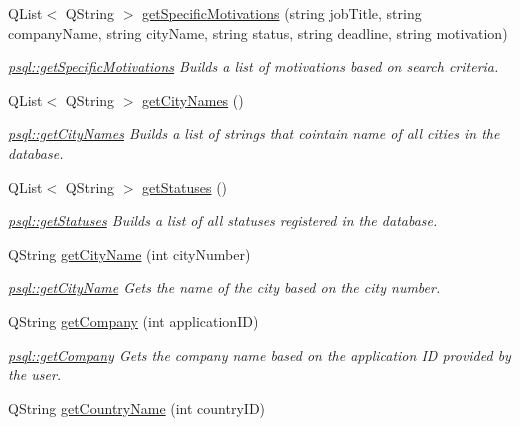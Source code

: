 \begin{DoxyCompactItemize}
Q\+List$<$ Q\+String $>$ \mbox{\hyperlink{classpsql_a7c86e4ba33784dece1bf897537087a68}{get\+Specific\+Motivations}} (string job\+Title, string company\+Name, string city\+Name, string status, string deadline, string motivation)
\begin{DoxyCompactList}\small\item\em \mbox{\hyperlink{classpsql_a7c86e4ba33784dece1bf897537087a68}{psql\+::get\+Specific\+Motivations}} Builds a list of motivations based on search criteria. \end{DoxyCompactList}\item 
Q\+List$<$ Q\+String $>$ \mbox{\hyperlink{classpsql_a42ee0cf90055ba6a7a6f564cf04d8bb8}{get\+City\+Names}} ()
\begin{DoxyCompactList}\small\item\em \mbox{\hyperlink{classpsql_a42ee0cf90055ba6a7a6f564cf04d8bb8}{psql\+::get\+City\+Names}} Builds a list of strings that cointain name of all cities in the database. \end{DoxyCompactList}\item 
Q\+List$<$ Q\+String $>$ \mbox{\hyperlink{classpsql_a14854d28aabc7e658aea87a7b8b52e5c}{get\+Statuses}} ()
\begin{DoxyCompactList}\small\item\em \mbox{\hyperlink{classpsql_a14854d28aabc7e658aea87a7b8b52e5c}{psql\+::get\+Statuses}} Builds a list of all statuses registered in the database. \end{DoxyCompactList}\item 
Q\+String \mbox{\hyperlink{classpsql_a7acc18034ef60c8a1e69b0e1a15d8ab2}{get\+City\+Name}} (int city\+Number)
\begin{DoxyCompactList}\small\item\em \mbox{\hyperlink{classpsql_a7acc18034ef60c8a1e69b0e1a15d8ab2}{psql\+::get\+City\+Name}} Gets the name of the city based on the city number. \end{DoxyCompactList}\item 
Q\+String \mbox{\hyperlink{classpsql_a09745cd03f09ffb2dacacaab4281915f}{get\+Company}} (int application\+ID)
\begin{DoxyCompactList}\small\item\em \mbox{\hyperlink{classpsql_a09745cd03f09ffb2dacacaab4281915f}{psql\+::get\+Company}} Gets the company name based on the application ID provided by the user. \end{DoxyCompactList}\item 
Q\+String \mbox{\hyperlink{classpsql_a5724e9992e6a5c98524ab73b98f4202d}{get\+Country\+Name}} (int country\+ID)

\end{DoxyCompactItemize}
